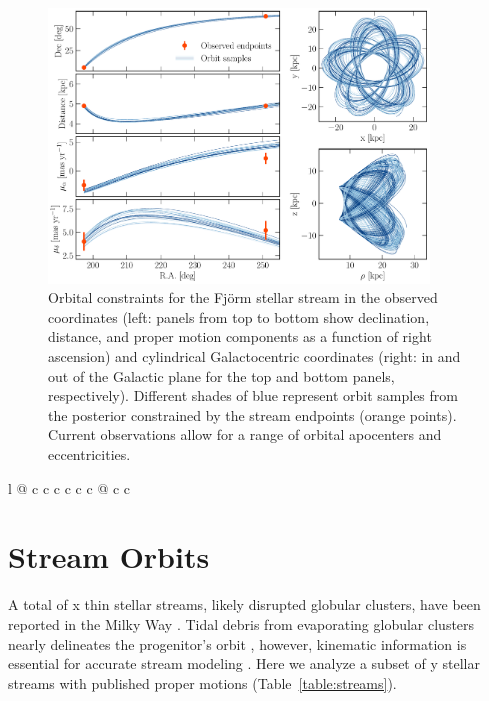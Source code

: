 \documentclass[twocolumn]{aastex63}
\newcommand{\package}[1]{\textsl{#1}}
\begin{document}
\begin{figure}
\begin{center}
\includegraphics[width=0.9\textwidth]{figures/stream_fitting.pdf}
\end{center}
\caption{Orbital constraints for the Fj\"{o}rm stellar stream in the observed coordinates (left: panels from top to bottom show declination, distance, and proper motion components as a function of right ascension) and cylindrical Galactocentric coordinates (right: in and out of the Galactic plane for the top and bottom panels, respectively).
Different shades of blue represent orbit samples from the posterior constrained by the stream endpoints (orange points).
Current observations allow for a range of orbital apocenters and eccentricities.
}
\label{fig:streams}
\end{figure}

\begin{deluxetable*}{l @{\hspace{0.5cm}} c c c c c c @{\hspace{0.8cm}} c c}
\startdata

\enddata
\end{deluxetable*}


\section{Stream Orbits}
\label{sec:orbits}
A total of x thin stellar streams, likely disrupted globular clusters, have been reported in the Milky Way \citep[an up-to-date list is available in the \package{galstreams} package,][]{mateu:2018}.
Tidal debris from evaporating globular clusters nearly delineates the progenitor's orbit \citep[e.g.,][]{kupper:2012}, however, kinematic information is essential for accurate stream modeling \citep{bh:2018}.
Here we analyze a subset of y stellar streams with published proper motions (Table~\ref{table:streams}).
\end{document}

